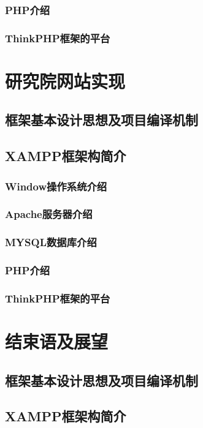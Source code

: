 \documentclass{xmuthesis}
\begin{document}
\begin{flushleft}
\subsection{PHP介绍}
\subsection{ThinkPHP框架的平台}

\newpage
\chapter{研究院网站实现}

\section{框架基本设计思想及项目编译机制}
\section{XAMPP框架构简介}
\subsection{Window操作系统介绍}
\subsection{Apache服务器介绍}
\subsection{MYSQL数据库介绍}
\subsection{PHP介绍}
\subsection{ThinkPHP框架的平台}

\newpage
\chapter{结束语及展望}

\section{框架基本设计思想及项目编译机制}
\section{XAMPP框架构简介}

\end{flushleft}
\end{document}
